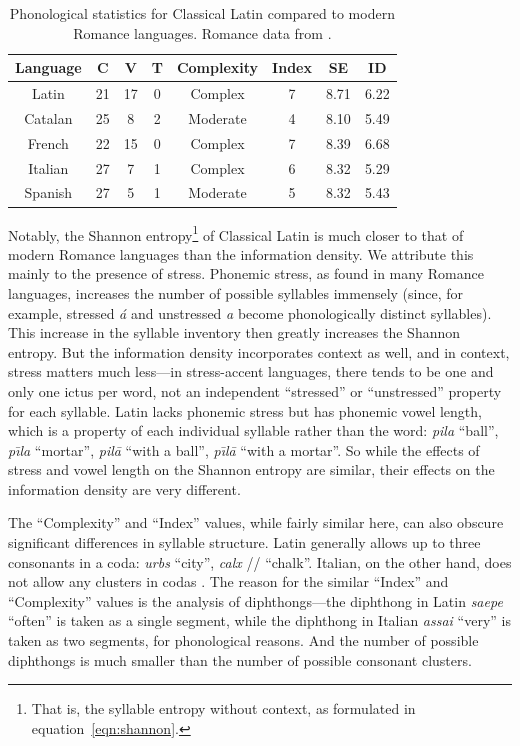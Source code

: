 \documentclass[12pt,twoside]{article}
\newcommand{\ipa}[1]{/\textipa{#1}/}
\begin{document}
\begin{table}[h]
\centering
\begin{tabular}{|c|c|c|c|c|c|c|c|}
\hline
\textbf{Language} & \textbf{C} & \textbf{V} & \textbf{T} & \textbf{Complexity} & \textbf{Index} & \textbf{SE} & \textbf{ID} \\\hline
Latin & 21 & 17 & 0 & Complex & 7 & 8.71 & 6.22 \\\hline
Catalan & 25 & 8 & 2 & Moderate & 4 & 8.10 & 5.49 \\\hline
French & 22 & 15 & 0 & Complex & 7 & 8.39 & 6.68 \\\hline
Italian & 27 & 7 & 1 & Complex & 6 & 8.32 & 5.29 \\\hline
Spanish & 27 & 5 & 1 & Moderate & 5 & 8.32 & 5.43 \\\hline
\end{tabular}
\caption{Phonological statistics for Classical Latin compared to modern Romance languages. Romance data from \cite[44-45]{oh}.}
\label{tab:phono}
\end{table}

Notably, the Shannon entropy\footnote{That is, the syllable entropy without context, as formulated in equation~\ref{eqn:shannon}.} of Classical Latin is much closer to that of modern Romance languages than the information density. We attribute this mainly to the presence of stress. Phonemic stress, as found in many Romance languages, increases the number of possible syllables immensely (since, for example, stressed \emph{\'a} and unstressed \emph{a} become phonologically distinct syllables). This increase in the syllable inventory then greatly increases the Shannon entropy. But the information density incorporates context as well, and in context, stress matters much less---in stress-accent languages, there tends to be one and only one ictus per word, not an independent ``stressed'' or ``unstressed'' property for each syllable. Latin lacks phonemic stress but has phonemic vowel length, which is a property of each individual syllable rather than the word: \emph{pila} ``ball'', \emph{p\=\i{}la} ``mortar'', \emph{pil\=a} ``with a ball'', \emph{p\=\i{}l\=a} ``with a mortar''. So while the effects of stress and vowel length on the Shannon entropy are similar, their effects on the information density are very different.

The ``Complexity'' and ``Index'' values, while fairly similar here, can also obscure significant differences in syllable structure. Latin generally allows up to three consonants in a coda: \emph{urbs} ``city'', \emph{calx} \ipa{calks} ``chalk''. Italian, on the other hand, does not allow any clusters in codas \citep{hall}. The reason for the similar ``Index'' and ``Complexity'' values is the analysis of diphthongs---the diphthong in Latin \emph{saepe} ``often'' is taken as a single segment, while the diphthong in Italian \emph{assai} ``very'' is taken as two segments, for phonological reasons. And the number of possible diphthongs is much smaller than the number of possible consonant clusters.
\end{document}
